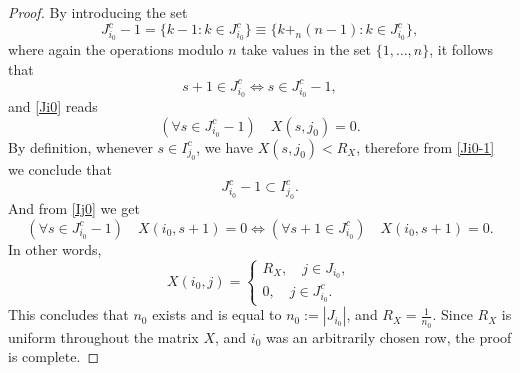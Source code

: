 \documentclass[10pt,a4paper]{amsart}
\begin{document}
\begin{proof}
		By introducing the set
		\begin{equation}
			\label{Ji01}J_{i_0}^c-1=\{k-1: k\in J_{i_0}^c\}\equiv \{k+_n (n-1): k\in J_{i_0}^c\},
		\end{equation}
		where again the operations modulo $n$ take values in the set $\{1,\ldots,n\}$, it follows that
		$$s+1\in J_{i_0}^c\Leftrightarrow s\in J_{i_0}^c-1,$$
		and \eqref{Ji0} reads \begin{equation}
			\label{Ji0-1} \left(\forall s\in J_{i_0}^c-1\right)\quad  X(s,j_0)=0.
		\end{equation}
		By definition, whenever $s\in I_{j_0}^c$, we have $X(s,j_0)<R_X$, therefore from \eqref{Ji0-1} we conclude that
		\begin{equation}
			J_{i_0}^c-1\subset I_{j_0}^c.
		\end{equation}
		And from \eqref{Ij0} we get
		$$\left(\forall s\in J_{i_0}^c-1\right)\quad X(i_0,s+1)=0\Leftrightarrow \left(\forall s+1\in J_{i_0}^c\right)\quad X(i_0,s+1)=0.$$
		In other words, 
		\begin{equation}\label{Xi0j}
			X(i_0,j)=\begin{cases} R_X,\quad j\in J_{i_0},\\0,\quad j\in J_{i_0}^c.
			\end{cases}
		\end{equation}
		This concludes that $n_0$ exists and is equal to $n_0:=|J_{i_0}|$, and $R_X=\frac{1}{n_0}$. Since $R_X$ is uniform throughout the matrix $X$, and $i_0$ was an arbitrarily chosen row, the proof is complete.
	\end{proof}
\end{document}
